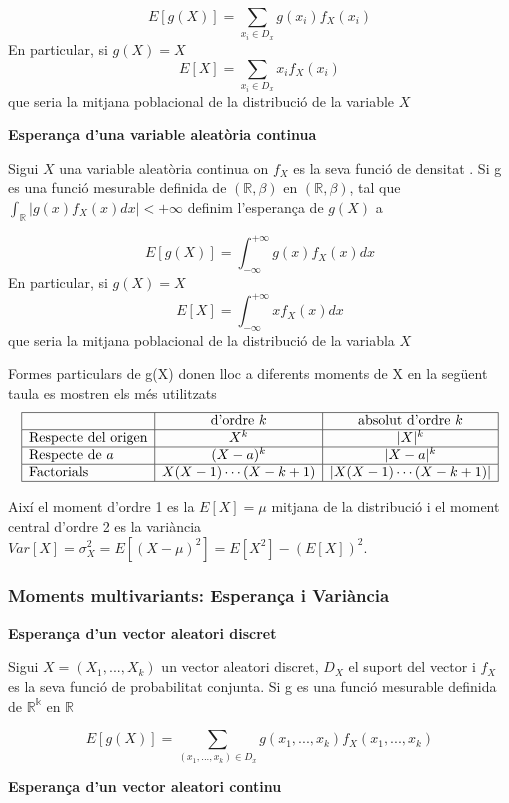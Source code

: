 \documentclass[
  catalan,
]{article}
\theoremstyle{definition}
\theoremstyle{definition}
\theoremstyle{definition}
\theoremstyle{definition}
\theoremstyle{remark}
\begin{document}
\[
 E[g(X)]=\sum_{x_i \in D_x} g(x_i)f_X(x_i)
 \]
En particular, si \(g(X)= X\)
\[
E[X]=\sum_{x_i \in D_x} x_if_X(x_i)
\]
que seria la mitjana poblacional de la distribució de la variable \(X\)

\textbf{Esperança d'una variable aleatòria continua}

Sigui \(X\) una variable aleatòria continua on \(f_X\) es la seva funció de densitat . Si g es una funció mesurable definida de \((\mathbb{R},\beta)\) en \((\mathbb{R},\beta)\), tal que \(\int_{\mathbb{R}} |g(x)f_X(x)dx|< + \infty\) definim l'esperança de \(g(X)\) a

\[
 E[g(X)]=\int_{-\infty}^{+\infty}  g(x)f_X(x)dx
 \]
En particular, si \(g(X)= X\)
\[
 E[X]=\int_{-\infty}^{+\infty}  xf_X(x)dx
\]
que seria la mitjana poblacional de la distribució de la variabla \(X\)

Formes particulars de g(X) donen lloc a diferents moments de X en la següent taula es mostren els més utilitzats
\[
\begin{array}{|l|c|c|}
\hline
 & \text{d'ordre } k & \text{absolut d'ordre } k \\
\hline
\text{Respecte del origen} & X^k & |X|^k \\
\hline
\text{Respecte de } a & (X-a)^k & |X-a|^k \\
\hline
\text{Factorials} & X(X-1)\cdots(X-k+1) &
|X(X-1)\cdots(X-k+1)| \\
\hline
\end{array}
\]

Així el moment d'ordre 1 es la \(E[X]=\mu\) mitjana de la distribució i el moment central d'ordre 2 es la variància \(Var[X]=\sigma_X^2=E[(X-\mu)^2]= E[X^2]-(E[X])^2\).

\subsubsection{Moments multivariants: Esperança i Variància}\label{moments-multivariants-esperanuxe7a-i-variuxe0ncia}

\textbf{Esperança d'un vector aleatori discret}

Sigui \(X=(X_1,...,X_k)\) un vector aleatori discret, \(D_X\) el suport del vector i \(f_X\) es la seva funció de probabilitat conjunta. Si g es una funció mesurable definida de \(\mathbb{R^k}\) en \(\mathbb{R}\)

\[
 E[g(X)]=\sum_{(x_1,...,x_k)  \in D_x} g(x_1,...,x_k)f_X(x_1,...,x_k)
 \]

\textbf{Esperança d'un vector aleatori continu}
\end{document}
